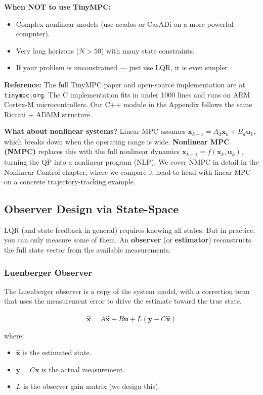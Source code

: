 \textbf{When NOT to use TinyMPC:}
\begin{itemize}
    \item Complex nonlinear models (use acados or CasADi on a more powerful computer).
    \item Very long horizons ($N > 50$) with many state constraints.
    \item If your problem is unconstrained --- just use LQR, it is even simpler.
\end{itemize}

\textbf{Reference:} The full TinyMPC paper and open-source implementation are at \texttt{tinympc.org}. The C implementation fits in under 1000 lines and runs on ARM Cortex-M microcontrollers. Our C++ module in the Appendix follows the same Riccati + ADMM structure.

\textbf{What about nonlinear systems?} Linear MPC assumes $\mathbf{x}_{k+1} = A_d \mathbf{x}_k + B_d \mathbf{u}_k$, which breaks down when the operating range is wide. \textbf{Nonlinear MPC (NMPC)} replaces this with the full nonlinear dynamics $\mathbf{x}_{k+1} = f(\mathbf{x}_k, \mathbf{u}_k)$, turning the QP into a nonlinear program (NLP). We cover NMPC in detail in the Nonlinear Control chapter, where we compare it head-to-head with linear MPC on a concrete trajectory-tracking example.

\subsection{Observer Design via State-Space}

LQR (and state feedback in general) requires knowing all states. But in practice, you can only measure some of them. An \textbf{observer} (or \textbf{estimator}) reconstructs the full state vector from the available measurements.

\subsubsection{Luenberger Observer}

The Luenberger observer is a copy of the system model, with a correction term that uses the measurement error to drive the estimate toward the true state.

\begin{equation}
\dot{\hat{\mathbf{x}}} = A\hat{\mathbf{x}} + B\mathbf{u} + L(\mathbf{y} - C\hat{\mathbf{x}})
\end{equation}

where:
\begin{itemize}[nosep]
    \item $\hat{\mathbf{x}}$ is the estimated state.
    \item $\mathbf{y} = C\mathbf{x}$ is the actual measurement.
    \item $L$ is the observer gain matrix (we design this).
\end{itemize}

